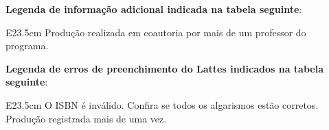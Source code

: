 \documentclass[12pt,brazil]{article}\usepackage[]{graphicx}\usepackage[]{xcolor}
\newcounter{tabela}
\begin{document}
\clearpage

\textbf{Legenda de informação adicional indicada na tabela seguinte}:

\begin{tabular}{E{23.5cm}}
Produção realizada em coautoria por mais de um professor do programa.\\
\end{tabular}


\textbf{Legenda de erros de preenchimento do Lattes indicados na tabela seguinte}:

\begin{tabular}{E{23.5cm}}
O ISBN é inválido. Confira se todos os algarismos estão corretos.\\
Produção registrada mais de uma vez.\\
\end{tabular}
\end{document}
